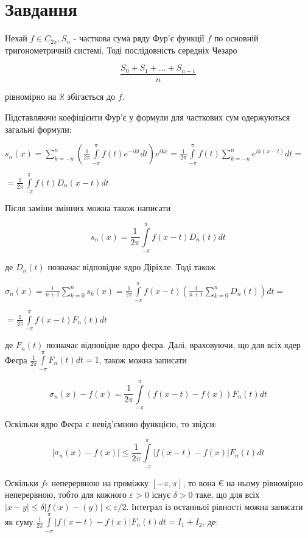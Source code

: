 \chapter{Завдання \theHchapter}

\begin{tcolorbox}[title=Теорема Л.Фейєра]
    Нехай $f \in C_{2 \pi}, S_n$ - часткова сума ряду Фур'є функції $f$ по основній тригонометричній системі. Тоді послідовність середніх Чезаро
    
    
    $$\frac{S_0+S_1+\ldots+S_{n-1}}{n}$$


    рівномірно на $\mathbb{R}$ збігається до $f$.

\end{tcolorbox}



Підставляючи коефіцієнти Фур'є у формули для 
часткових сум одержуються загальні формули:

$s_n(x)=\sum\limits_{k=-n}^n(\frac{1}{2 \pi} \int\limits_{-\pi}^\pi 
f(t) e^{-i k t}d t) e^{i k x}=\frac{1}{2 \pi} \int\limits_{-\pi}^\pi 
f(t) \sum\limits_{k=-n}^n e^{i k(x-t)} d t=$


$=\frac{1}{2 \pi} \int\limits_{-\pi}^\pi f(t) D_n(x-t) dt$


Після заміни змінних можна також написати


$$s_n(x)=\frac{1}{2 \pi} \int\limits_{-\pi}^\pi f(x-t) D_n(t) d t$$


де $D_n(t)$ позначає відповідне ядро Діріхле.
Тоді також

\pagebreak

$\sigma_n(x)=\frac{1}{n+1} \sum\limits_{k=0}^n s_k(x)=\frac{1}{2 \pi} 
\int\limits_{-\pi}^\pi f(x-t)(\frac{1}{n+1}\sum\limits_{k=0}^n D_n(t)) 
d t=$


$=\frac{1}{2 \pi} \int\limits_{-\pi}^\pi f(x-t) F_n(t) d t$


де $F_n(t)$ позначає відповідне ядро феєра.
Далі, враховуючи, що для всіх ядер Феєра 
$\frac{1}{2 \pi} \int\limits_{-\pi}^\pi F_n(t) d t=1$, також можна записати


$$\sigma_n(x)-f(x)=\frac{1}{2 \pi} 
\int\limits_{-\pi}^\pi(f(x-t)-f(x)) F_n(t) d t$$


Оскільки ядро Феєра є невід'ємною функцією, то звідси:


$$|\sigma_n(x)-f(x)| \leqslant \frac{1}{2 \pi} 
\int\limits_{-\pi}^\pi|f(x-t)-f(x)| F_n(t) d t$$


Оскільки $f \epsilon$ неперервною на проміжку $[-\pi, \pi]$, то вона $€$ 
на ньому рівномірно неперервною, тобто для кожного $\varepsilon>0$ існує 
$\delta>0$ таке, що для всіх $|x-y| \leqslant \delta
|f(x)-(y)|<\varepsilon / 2$. 
Інтеграл із останньої рівності можна записати як суму 
$\frac{1}{2 \pi} \int\limits_{-\pi}^\pi
|f(x-t)-f(x)| F_n(t) d t=I_1+I_2$, де:


